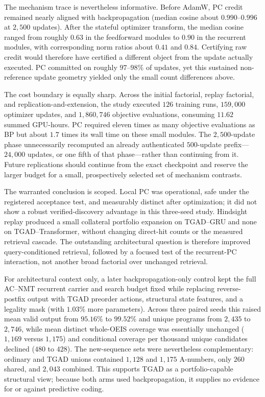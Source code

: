 \documentclass[11pt]{article}
\begin{document}
The mechanism trace is nevertheless informative.  Before AdamW, PC credit remained
nearly aligned with backpropagation (median cosine about $0.990$--$0.996$ at $2{,}500$
updates).  After the stateful optimizer transform, the median cosine ranged from roughly
$0.63$ in the feedforward modules to $0.90$ in the recurrent modules, with corresponding
norm ratios about $0.41$ and $0.84$.  Certifying raw credit would therefore have certified
a different object from the update actually executed.  PC committed on roughly
$97$--$98\%$ of updates, yet this sustained non-reference update geometry yielded only the
small count differences above.

The cost boundary is equally sharp.  Across the initial factorial, replay factorial, and
replication-and-extension, the study executed $126$ training runs, $159{,}000$ optimizer
updates, and $1{,}860{,}746$ objective evaluations, consuming $11.62$ summed GPU-hours.
PC required eleven times as many objective evaluations as BP but about $1.7$ times its
wall time on these small modules.  The $2{,}500$-update phase unnecessarily recomputed an
already authenticated $500$-update prefix---$24{,}000$ updates, or one fifth of that
phase---rather than continuing from it.  Future replications should continue from the
exact checkpoint and reserve the larger budget for a small, prospectively selected set
of mechanism contrasts.

The warranted conclusion is scoped.  Local PC was operational, safe under the registered
acceptance test, and measurably distinct after optimization; it did not show a robust
verified-discovery advantage in this three-seed study.  Hindsight replay produced a small
collateral portfolio expansion on TGAD--GRU and none on TGAD--Transformer, without changing
direct-hit counts or the measured retrieval cascade.  The outstanding architectural
question is therefore improved query-conditioned retrieval, followed by a focused test
of the recurrent-PC interaction, not another broad factorial over unchanged retrieval.

For architectural context only, a later backpropagation-only control kept the full
AC--NMT recurrent carrier and search budget fixed while replacing reverse-postfix output
with TGAD preorder actions, structural state features, and a legality mask (with $1.03\%$
more parameters).  Across three paired seeds this raised mean valid output from
$95.16\%$ to $99.52\%$ and unique programs from $2{,}435$ to $2{,}746$, while mean
distinct whole-OEIS coverage was essentially unchanged ($1{,}169$ versus $1{,}175$) and
conditional coverage per thousand unique candidates declined ($480$ to $428$).  The
new-sequence sets were nevertheless complementary: ordinary and TGAD unions contained
$1{,}128$ and $1{,}175$ A-numbers, only $260$ shared, and $2{,}043$ combined.  This
supports TGAD as a portfolio-capable structural view; because both arms used
backpropagation, it supplies no evidence for or against predictive coding.
\end{document}
